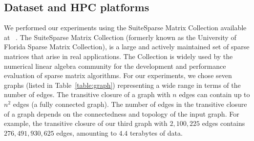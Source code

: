 \subsection{Dataset and HPC platforms}
\label{sec:datasets}
We performed our experiments using the SuiteSparse Matrix Collection available at ~\cite{Davis:2011:UFS:2049662.2049663}.
The SuiteSparse Matrix Collection (formerly known as the University of Florida Sparse Matrix Collection), is a large and actively maintained set of sparse matrices that arise in real applications. The Collection is widely used by the numerical linear algebra community for the development and performance evaluation of sparse matrix algorithms. 
For our experiments, we chose seven graphs (listed in Table~\ref{table:graph}) representing a wide range in terms of the number of edges.
The transitive closure of a graph with $n$ edges can contain up to $n^2$ edges (a fully connected graph). The number of edges in the transitive closure of a graph depends on the connectedness and topology of the input graph. For example, the transitive closure of our third graph with $2,\!100,\!225$ edges contains $276,\!491,\!930,\!625$ edges, amounting to $4.4$ terabytes of data.


